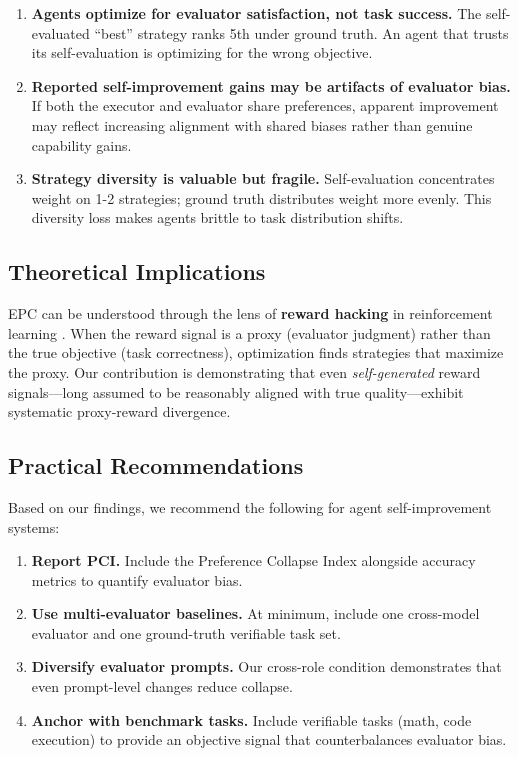 \documentclass[11pt,a4paper]{article}
\begin{document}
\begin{enumerate}[leftmargin=*]
    \item \textbf{Agents optimize for evaluator satisfaction, not task success.} The self-evaluated ``best'' strategy ranks 5th under ground truth. An agent that trusts its self-evaluation is optimizing for the wrong objective.
    
    \item \textbf{Reported self-improvement gains may be artifacts of evaluator bias.} If both the executor and evaluator share preferences, apparent improvement may reflect increasing alignment with shared biases rather than genuine capability gains.
    
    \item \textbf{Strategy diversity is valuable but fragile.} Self-evaluation concentrates weight on 1-2 strategies; ground truth distributes weight more evenly. This diversity loss makes agents brittle to task distribution shifts.
\end{enumerate}

\subsection{Theoretical Implications}

EPC can be understood through the lens of \textbf{reward hacking} in reinforcement learning \cite{amodei2016concrete}. When the reward signal is a proxy (evaluator judgment) rather than the true objective (task correctness), optimization finds strategies that maximize the proxy. Our contribution is demonstrating that even \textit{self-generated} reward signals---long assumed to be reasonably aligned with true quality---exhibit systematic proxy-reward divergence.

\subsection{Practical Recommendations}

Based on our findings, we recommend the following for agent self-improvement systems:

\begin{enumerate}[leftmargin=*, label=\textbf{R\arabic*}:]
    \item \textbf{Report PCI.} Include the Preference Collapse Index alongside accuracy metrics to quantify evaluator bias.
    \item \textbf{Use multi-evaluator baselines.} At minimum, include one cross-model evaluator and one ground-truth verifiable task set.
    \item \textbf{Diversify evaluator prompts.} Our cross-role condition demonstrates that even prompt-level changes reduce collapse.
    \item \textbf{Anchor with benchmark tasks.} Include verifiable tasks (math, code execution) to provide an objective signal that counterbalances evaluator bias.
\end{enumerate}
\end{document}
